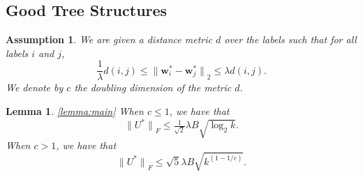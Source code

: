 \documentclass[twoside]{article}
\newtheorem{assumption}{Assumption}
\newtheorem{lemma}{Lemma}
\renewcommand{\star}[1]{{#1}^{*}}
\newcommand{\w}{\mathbf w}
\newcommand{\ltwo}[1]{{\lVert {#1} \rVert}_2}
\newcommand{\lF}[1]{{\lVert {#1} \rVert}_F}
\begin{document}
\subsection{Good Tree Structures}

\begin{assumption}
We are given a distance metric $d$ over the labels such that for all labels $i$ and $j$,
\begin{equation}
    \frac 1 \lambda d(i,j)
    \le \ltwo{\star \w_i - \star \w_j}
    \le \lambda d(i, j).
\end{equation}
We denote by $c$ the doubling dimension of the metric $d$.
\end{assumption}

\begin{lemma}
    \ref{lemma:main}
    When $c\le1$, we have that
    \begin{equation}
        \lF{\star U} \le \tfrac{1}{\sqrt2}\lambda B \sqrt{\log_2 k}.
        \label{eq:c<=1}
    \end{equation}
    When $c>1$, we have that
    \begin{equation}
        \lF{\star U} \le \sqrt{5}\lambda B \sqrt{k^{(1-1/c)}}.
        \label{eq:c>1}
    \end{equation}
\end{lemma}
\end{document}
